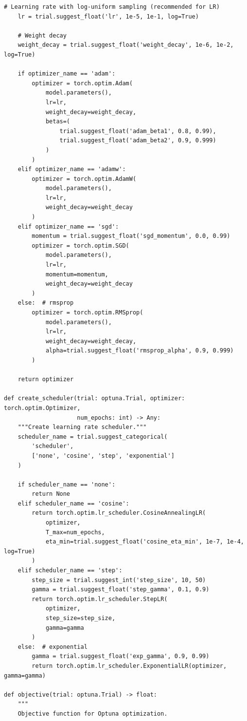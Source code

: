 \begin{lstlisting}[style=python, caption=Advanced Optuna hyperparameter optimization]
    # Learning rate with log-uniform sampling (recommended for LR)
    lr = trial.suggest_float('lr', 1e-5, 1e-1, log=True)

    # Weight decay
    weight_decay = trial.suggest_float('weight_decay', 1e-6, 1e-2, log=True)

    if optimizer_name == 'adam':
        optimizer = torch.optim.Adam(
            model.parameters(),
            lr=lr,
            weight_decay=weight_decay,
            betas=(
                trial.suggest_float('adam_beta1', 0.8, 0.99),
                trial.suggest_float('adam_beta2', 0.9, 0.999)
            )
        )
    elif optimizer_name == 'adamw':
        optimizer = torch.optim.AdamW(
            model.parameters(),
            lr=lr,
            weight_decay=weight_decay
        )
    elif optimizer_name == 'sgd':
        momentum = trial.suggest_float('sgd_momentum', 0.0, 0.99)
        optimizer = torch.optim.SGD(
            model.parameters(),
            lr=lr,
            momentum=momentum,
            weight_decay=weight_decay
        )
    else:  # rmsprop
        optimizer = torch.optim.RMSprop(
            model.parameters(),
            lr=lr,
            weight_decay=weight_decay,
            alpha=trial.suggest_float('rmsprop_alpha', 0.9, 0.999)
        )

    return optimizer

def create_scheduler(trial: optuna.Trial, optimizer: torch.optim.Optimizer,
                     num_epochs: int) -> Any:
    """Create learning rate scheduler."""
    scheduler_name = trial.suggest_categorical(
        'scheduler',
        ['none', 'cosine', 'step', 'exponential']
    )

    if scheduler_name == 'none':
        return None
    elif scheduler_name == 'cosine':
        return torch.optim.lr_scheduler.CosineAnnealingLR(
            optimizer,
            T_max=num_epochs,
            eta_min=trial.suggest_float('cosine_eta_min', 1e-7, 1e-4, log=True)
        )
    elif scheduler_name == 'step':
        step_size = trial.suggest_int('step_size', 10, 50)
        gamma = trial.suggest_float('step_gamma', 0.1, 0.9)
        return torch.optim.lr_scheduler.StepLR(
            optimizer,
            step_size=step_size,
            gamma=gamma
        )
    else:  # exponential
        gamma = trial.suggest_float('exp_gamma', 0.9, 0.99)
        return torch.optim.lr_scheduler.ExponentialLR(optimizer, gamma=gamma)

def objective(trial: optuna.Trial) -> float:
    """
    Objective function for Optuna optimization.


\end{lstlisting}
